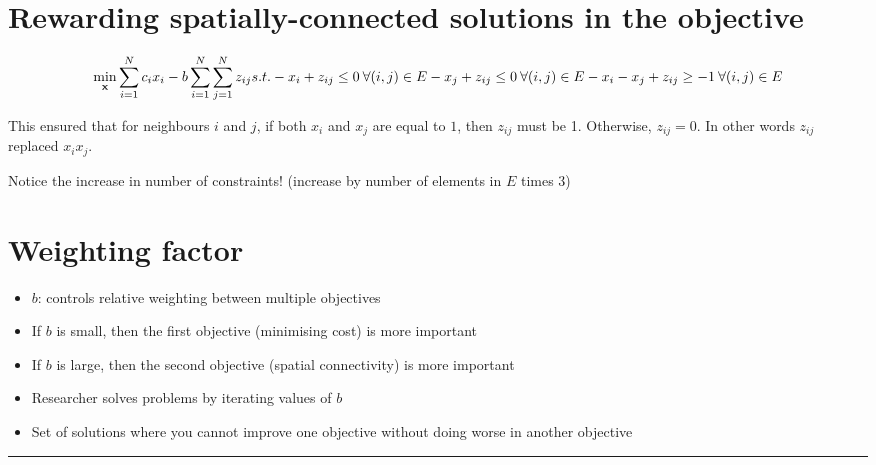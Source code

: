 \documentclass[
]{article}
\providecommand{\tightlist}{%
  \setlength{\itemsep}{0pt}\setlength{\parskip}{0pt}}
\begin{document}
\hypertarget{rewarding-spatially-connected-solutions-in-the-objective}{%
\section{Rewarding spatially-connected solutions in the
objective}\label{rewarding-spatially-connected-solutions-in-the-objective}}

\[
\min_{\mathbf{x}} \sum_{i=1}^N c_ix_i - b \sum_{i=1}^N \sum_{j=1}^N z_{ij} \\
s.t. - x_i + z_{ij} \leq 0  \: \forall (i,j) \in E \\
- x_j + z_{ij} \leq 0  \:  \forall (i,j) \in E \\
- x_i - x_j + z_{ij} \geq -1  \:  \forall (i,j) \in E
\]

This ensured that for neighbours \(i\) and \(j\), if both \(x_i\) and
\(x_j\) are equal to \(1\), then \(z_{ij}\) must be 1. Otherwise,
\(z_{ij} = 0\). In other words \(z_{ij}\) replaced \(x_ix_j\).

Notice the increase in number of constraints! (increase by number of
elements in \(E\) times 3)

\hypertarget{weighting-factor}{%
\section{Weighting factor}\label{weighting-factor}}

\begin{itemize}
\tightlist
\item
  \(b\): controls relative weighting between multiple objectives
\item
  If \(b\) is small, then the first objective (minimising cost) is more
  important
\item
  If \(b\) is large, then the second objective (spatial connectivity) is
  more important
\item
  Researcher solves problems by iterating values of \(b\)
\item
  Set of solutions where you cannot improve one objective without doing
  worse in another objective
\end{itemize}

\begin{center}\rule{0.5\linewidth}{0.5pt}\end{center}
\end{document}

